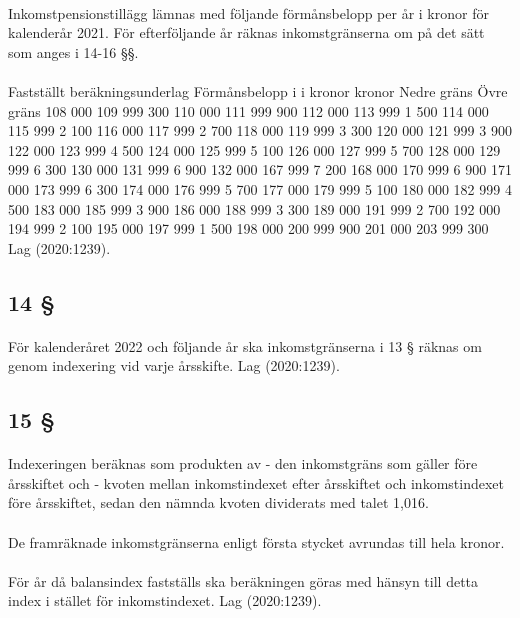 \documentclass[a4paper,notitlepage,openany,10pt]{book}
\begin{document}
\paragraph*{}
Inkomstpensionstillägg lämnas med följande förmånsbelopp per år i kronor för kalenderår 2021. För efterföljande år räknas inkomstgränserna om på det sätt som anges i 14-16 §§.
\paragraph*{}
Fastställt beräkningsunderlag Förmånsbelopp i
i kronor kronor
Nedre gräns Övre gräns
108 000 109 999 300
110 000 111 999 900
112 000 113 999 1 500
114 000 115 999 2 100
116 000 117 999 2 700
118 000 119 999 3 300
120 000 121 999 3 900
122 000 123 999 4 500
124 000 125 999 5 100
126 000 127 999 5 700
128 000 129 999 6 300
130 000 131 999 6 900
132 000 167 999 7 200
168 000 170 999 6 900
171 000 173 999 6 300
174 000 176 999 5 700
177 000 179 999 5 100
180 000 182 999 4 500
183 000 185 999 3 900
186 000 188 999 3 300
189 000 191 999 2 700
192 000 194 999 2 100
195 000 197 999 1 500
198 000 200 999 900
201 000 203 999 300
Lag (2020:1239).
\subsection*{14 §}
\paragraph*{}
För kalenderåret 2022 och följande år ska inkomstgränserna i 13 § räknas om genom indexering vid varje årsskifte.
Lag (2020:1239).
\subsection*{15 §}
\paragraph*{}
Indexeringen beräknas som produkten av
\newline - den inkomstgräns som gäller före årsskiftet och
\newline - kvoten mellan inkomstindexet efter årsskiftet och inkomstindexet före årsskiftet, sedan den nämnda kvoten dividerats med talet 1,016.
\paragraph*{}
De framräknade inkomstgränserna enligt första stycket avrundas till hela kronor.
\paragraph*{}
För år då balansindex fastställs ska beräkningen göras med hänsyn till detta index i stället för inkomstindexet.
Lag (2020:1239).
\end{document}
